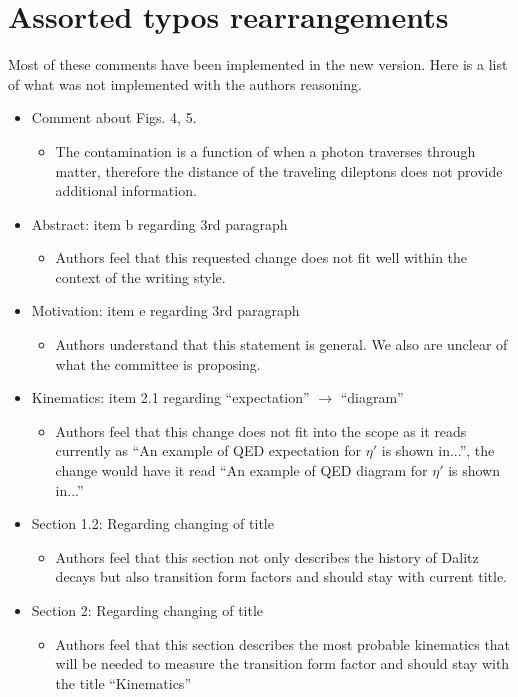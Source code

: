 \documentclass[10pt,a4paper]{report}
\begin{document}
\section*{Assorted typos rearrangements}
Most of these comments have been implemented in the new version. Here is a list of what was not implemented with the authors reasoning.
\begin{itemize}
	\item Comment about Figs. 4, 5.
	\begin{itemize}
		\item The contamination is a function of when a photon traverses through matter, therefore the distance of the traveling dileptons does not provide additional information.
	\end{itemize}
	\item Abstract: item b regarding 3rd paragraph
	\begin{itemize}
		\item Authors feel that this requested change does not fit well within the context of the writing style.
	\end{itemize}
		\item Motivation: item e regarding 3rd paragraph
	\begin{itemize}
		\item Authors understand that this statement is general. We also are unclear of what the committee is proposing.
	\end{itemize}
	\item Kinematics: item 2.1 regarding ``expectation'' $\to$ ``diagram''
	\begin{itemize}
		\item Authors feel that this change does not fit into the scope as it reads currently as ``An example of QED expectation for $\eta'$ is shown in...'', the change would have it read ``An example of QED diagram for $\eta'$ is shown in...''
	\end{itemize}
	\item Section 1.2: Regarding changing of title
	\begin{itemize}
		\item Authors feel that this section not only describes the history of Dalitz decays but also transition form factors and should stay with current title.
	\end{itemize}
	\item Section 2: Regarding changing of title
	\begin{itemize}
		\item Authors feel that this section describes the most probable kinematics that will be needed to measure the transition form factor and should stay with the title ``Kinematics''

\end{itemize}
\end{itemize}
\end{document}

